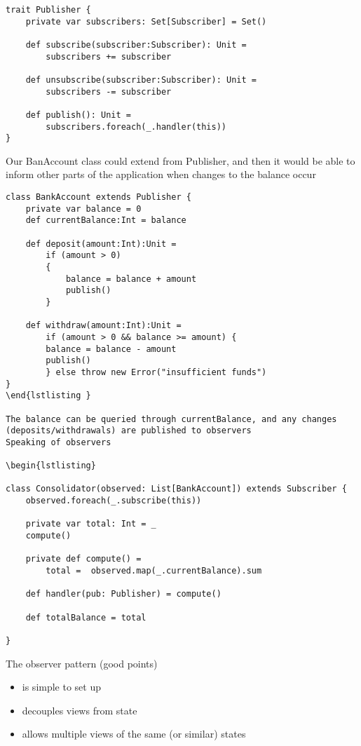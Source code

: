 \begin{lstlisting}
trait Publisher {
	private var subscribers: Set[Subscriber] = Set()

	def subscribe(subscriber:Subscriber): Unit = 
		subscribers += subscriber

	def unsubscribe(subscriber:Subscriber): Unit = 
		subscribers -= subscriber

	def publish(): Unit = 
		subscribers.foreach(_.handler(this))
}
\end{lstlisting}

Our BanAccount class could extend from Publisher, and then it would be able to inform other parts of the application when changes to the balance occur

\begin{lstlisting}
class BankAccount extends Publisher {
	private var balance = 0
	def currentBalance:Int = balance

	def deposit(amount:Int):Unit = 
		if (amount > 0) 
		{
			balance = balance + amount
			publish()
		}

	def withdraw(amount:Int):Unit = 
		if (amount > 0 && balance >= amount) {
		balance = balance - amount
		publish()
		} else throw new Error("insufficient funds")
}
\end{lstlisting }

The balance can be queried through currentBalance, and any changes (deposits/withdrawals) are published to observers
Speaking of observers

\begin{lstlisting}

class Consolidator(observed: List[BankAccount]) extends Subscriber {
	observed.foreach(_.subscribe(this))

	private var total: Int = _
	compute()

	private def compute() =
		total =  observed.map(_.currentBalance).sum

	def handler(pub: Publisher) = compute()

	def totalBalance = total

}
\end{lstlisting}

The observer pattern (good points)
\begin{itemize}
	\item is simple to set up
	\item decouples views from state
	\item allows multiple views of the same (or similar) states
\end{itemize}

